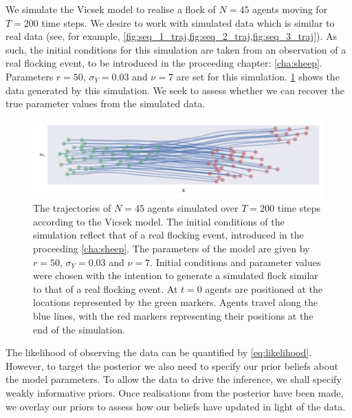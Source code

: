 We simulate the Vicsek model to realise a flock of $N=45$ agents moving for
$T=200$ time steps. We desire to work with simulated data which is similar to
real data (see, for example,
\cref{fig:seq_1_traj,fig:seq_2_traj,fig:seq_3_traj}). As such, the initial
conditions for this simulation are taken from an observation of a real flocking
event, to be introduced in the proceeding chapter: \cref{cha:sheep}. Parameters
$r=50$, $\sigma_Y=0.03$ and $\nu=7$ are set for this simulation.
\cref{fig:vicsek_sim} shows the data generated by this simulation. We seek to
assess whether we can recover the true parameter values from the simulated
data.

\begin{figure}[tbp]
  \includegraphics{r/r_sim.pdf}
  \caption{The trajectories of $N=45$ agents simulated over $T=200$ time steps
      according to the Vicsek model. The initial conditions of the simulation
      reflect that of a real flocking event, introduced in the proceeding
      \cref{cha:sheep}. The parameters of the model are given by $r=50$,
      $\sigma_Y=0.03$ and $\nu=7$. Initial conditions and parameter values were
      chosen with the intention to generate a simulated flock similar to that
      of a real flocking event. At $t=0$ agents are positioned at the locations
      represented by the green markers. Agents travel along the blue lines, with
      the red markers representing their positions at the end of the simulation.}
  \label{fig:vicsek_sim}
\end{figure}

The likelihood of observing the data can be quantified by \cref{eq:likelihood}.
However, to target the posterior we also need to specify our prior beliefs
about the model parameters. To allow the data to drive the inference, we shall
specify weakly informative priors. Once realisations from the posterior have
been made, we overlay our priors to assess how our beliefs have updated in
light of the data.


